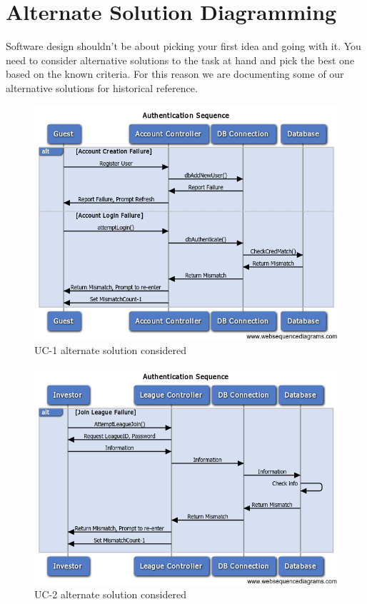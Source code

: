 \section{Alternate Solution Diagramming}

Software design shouldn't be about picking your first idea and going with it.
You need to consider alternative solutions to the task at hand and pick the best
one based on the known criteria.  For this reason we are documenting some of
our alternative solutions for historical reference.\\

\begin{figure}[H]
\centering
\includegraphics[width=5.5in]{./img/inter/alt1.png}
\caption{UC-1 alternate solution considered}
\end{figure}
\begin{figure}[H]
\centering
\includegraphics[width=5.5in]{./img/inter/alt2.png}
\caption{UC-2 alternate solution considered}
\end{figure}
